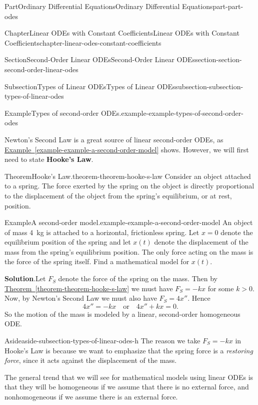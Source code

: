 \documentclass[twoside,10pt,]{book}
\newcommand{\blocktitlefont}{\relax}
\newcommand{\xreffont}{\relax}
\newcommand{\terminology}[1]{\textbf{#1}}
\numberwithin{equation}{part}
\begin{document}
\begin{partptx}{Part}{Ordinary Differential Equations}{}{Ordinary Differential Equations}{}{}{part-part-odes}
\begin{chapterptx}{Chapter}{Linear ODEs with Constant Coefficients}{}{Linear ODEs with Constant Coefficients}{}{}{chapter-linear-odes-constant-coefficients}
\begin{sectionptx}{Section}{Second-Order Linear ODEs}{}{Second-Order Linear ODEs}{}{}{section-section-second-order-linear-odes}
\begin{subsectionptx}{Subsection}{Types of Linear ODEs}{}{Types of Linear ODEs}{}{}{subsection-subsection-types-of-linear-odes}
\begin{example}{Example}{Types of second-order ODEs.}{example-example-types-of-second-order-odes}
%
\end{example}
Newton's Second Law is a great source of linear second-order ODEs, as \hyperref[example-example-a-second-order-model]{Example~{\xreffont\ref{example-example-a-second-order-model}}} shows. However, we will first need to state \terminology{Hooke's Law}.%
\begin{theorem}{Theorem}{Hooke's Law.}{}{theorem-theorem-hooke-s-law}%
%
Consider an object attached to a spring. The force exerted by the spring on the object is directly proportional to the displacement of the object from the spring's equilibrium, or at rest, position.%
\end{theorem}
\begin{example}{Example}{A second-order model.}{example-example-a-second-order-model}%
An object of mass \SI{4}{\kilo\gram} is attached to a horizontal, frictionless spring. Let \(x=0\) denote the equilibrium position of the spring and let \(x(t)\) denote the displacement of the mass from the spring's equilibrium position. The only force acting on the mass is the force of the spring itself. Find a mathematical model for \(x(t)\).%
\par\smallskip%
\noindent\textbf{\blocktitlefont Solution}.\hypertarget{solution-example-a-second-order-model-c}{}\quad{}Let \(F_{S}\) denote the force of the spring on the mass. Then by \hyperref[theorem-theorem-hooke-s-law]{Theorem~{\xreffont\ref{theorem-theorem-hooke-s-law}}} we must have \(F_{S} = -kx\) for some \(k>0\). Now, by Newton's Second Law we must also have \(F_{S} = 4x''\). Hence%
\begin{equation*}
4x'' = -kx\quad\text{or}\quad4x''+kx = 0.
\end{equation*}
So the motion of the mass is modeled by a linear, second-order homogeneous ODE.%
\end{example}
\begin{aside}{Aside}{}{aside-subsection-types-of-linear-odes-h}%
The reason we take \(F_{S} = -kx\) in Hooke's Law is because we want to emphasize that the spring force is a \emph{restoring force}, since it acts against the displacement of the mass.%
\end{aside}
The general trend that we will see for mathematical models using linear ODEs is that they will be homogeneous if we assume that there is no external force, and nonhomogeneous if we assume there is an external force.%
\end{subsectionptx}
%
%
\typeout{************************************************}

\end{sectionptx}
\end{chapterptx}
\end{partptx}
\end{document}
